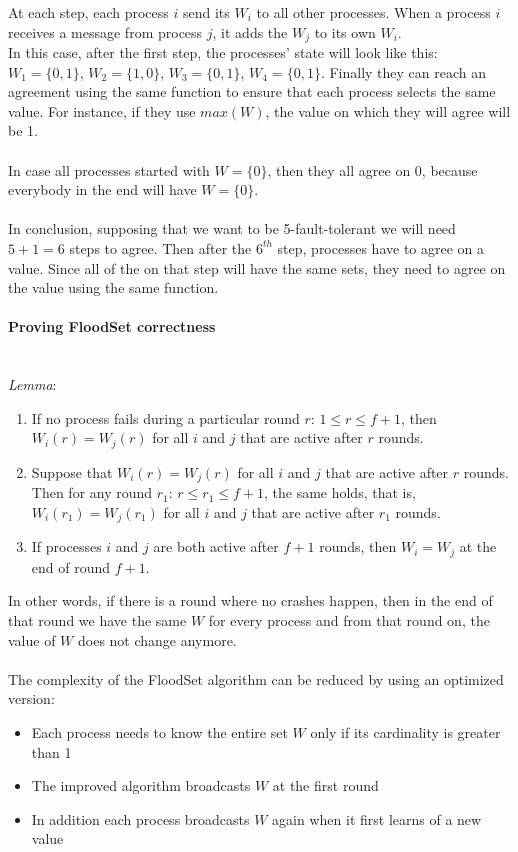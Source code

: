 \documentclass[10pt,a4paper]{article}
\newcommand{\myparagraph}[1]{\paragraph{#1}\mbox{}\\[0.05in]}
\begin{document}
At each step, each process $i$ send its $W_i$ to all other processes. When a process $i$ receives a message from process $j$, it adds the $W_j$ to its own $W_i$. \\ In this case, after the first step, the processes' state will look like this: \\
$W_1=\{0,1\}$, $W_2=\{1,0\}$, $W_3=\{0,1\}$, $W_4=\{0,1\}$.
Finally they can reach an agreement using the same function to ensure that each process selects the same value. For instance, if they use $max(W)$, the value on which they will agree will be 1. \\ \\ In case all processes started with $W=\{0\}$, then they all agree on 0, because everybody in the end will have $W=\{0\}$. \\ \\ In conclusion, supposing that we want to be 5-fault-tolerant we will need $5+1=6$ steps to agree. Then after the $6^{th}$ step, processes have to agree on a value. Since all of the on that step will have the same sets, they need to agree on the value using the same function. \pagebreak
\myparagraph{Proving FloodSet correctness}
\textit{Lemma}:
\begin{enumerate}
	\item If no process fails during a particular round $r$: $1 \leq r \leq f+1$, then $W_i(r)=W_j(r)$ for all $i$ and $j$ that are active after $r$ rounds.
	\item Suppose that $W_i(r)=W_j(r)$ for all $i$ and $j$ that are active after $r$ rounds. Then for any round $r_1$: $r \leq r_1 \leq f+1$, the same holds, that is, $W_i(r_1)=W_j(r_1)$ for all $i$ and $j$ that are active after $r_1$ rounds.
	\item If processes $i$ and $j$ are both active after $f+1$ rounds, then $W_i=W_j$ at the end of round $f+1$.
\end{enumerate}
In other words, if there is a round where no crashes happen, then in the end of that round we have the same $W$ for every process and from that round on, the value of $W$ does not change anymore. \\ \\
The complexity of the FloodSet algorithm can be reduced by using an optimized version:
\begin{itemize}
	\item Each process needs to know the entire set $W$ only if its cardinality is greater than 1
	\item The improved algorithm broadcasts $W$ at the first round
	\item In addition each process broadcasts $W$ again when it first learns of a new value
\end{itemize}
\end{document}
